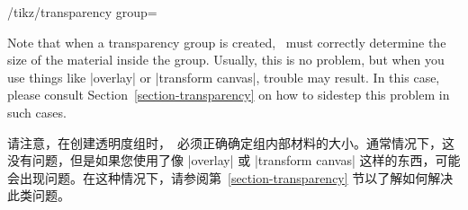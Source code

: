 \begin{key}{/tikz/transparency group=}
\begin{itemize}
    \end{itemize}

    Note that when a transparency group is created, \tikzname\ must correctly
    determine the size of the material inside the group. Usually, this is no
    problem, but when you use things like |overlay| or |transform canvas|,
    trouble may result. In this case, please consult
    Section~\ref{section-transparency} on how to sidestep this problem in such
    cases.

    请注意，在创建透明度组时，\tikzname\ 必须正确确定组内部材料的大小。通常情况下，这没有问题，但是如果您使用了像 |overlay| 或 |transform canvas| 这样的东西，可能会出现问题。在这种情况下，请参阅第~\ref{section-transparency} 节以了解如何解决此类问题。


\end{key}



